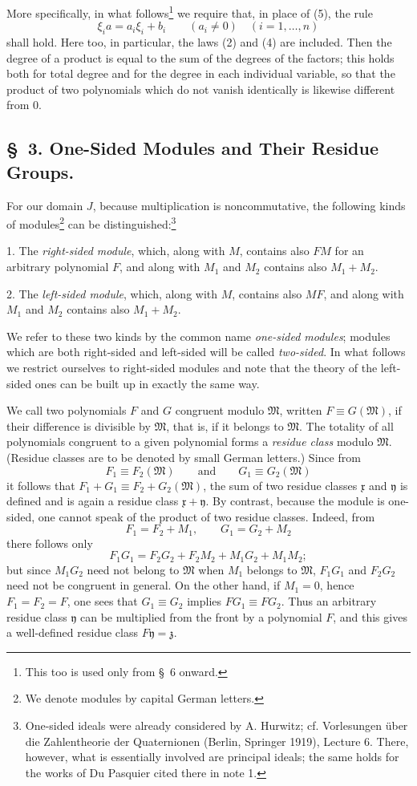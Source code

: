 \documentclass[11pt]{article}
\newcommand{\mM}{\mathfrak{M}}
\newcommand{\mx}{\mathfrak{x}}
\newcommand{\my}{\mathfrak{y}}
\newcommand{\mz}{\mathfrak{z}}
\begin{document}
More specifically, in what follows\footnote{This too is used only from \S~6 onward.} we require that, in place of (5), the rule
\begin{equation}
 \xi_i a=a_i\xi_i+b_i\qquad (a_i\ne0)\quad(i=1,\ldots,n)
\tag{6}
\end{equation}
shall hold. Here too, in particular, the laws (2) and (4) are included. Then the degree of a product is equal to the sum of the degrees of the factors; this holds both for total degree and for the degree in each individual variable, so that the product of two polynomials which do not vanish identically is likewise different from 0.

\subsection*{\S~3. One-Sided Modules and Their Residue Groups.}

For our domain $J$, because multiplication is noncommutative, the following kinds of modules\footnote{We denote modules by capital German letters.} can be distinguished:\footnote{One-sided ideals were already considered by A. Hurwitz; cf. Vorlesungen über die Zahlentheorie der Quaternionen (Berlin, Springer 1919), Lecture 6. There, however, what is essentially involved are principal ideals; the same holds for the works of Du Pasquier cited there in note 1.}

1. The \emph{right-sided module}, which, along with $M$, contains also $FM$ for an arbitrary polynomial $F$, and along with $M_1$ and $M_2$ contains also $M_1+M_2$.

2. The \emph{left-sided module}, which, along with $M$, contains also $MF$, and along with $M_1$ and $M_2$ contains also $M_1+M_2$.

We refer to these two kinds by the common name \emph{one-sided modules}; modules which are both right-sided and left-sided will be called \emph{two-sided}. In what follows we restrict ourselves to right-sided modules and note that the theory of the left-sided ones can be built up in exactly the same way.

We call two polynomials $F$ and $G$ congruent modulo $\mM$, written $F\equiv G(\mM)$, if their difference is divisible by $\mM$, that is, if it belongs to $\mM$. The totality of all polynomials congruent to a given polynomial forms a \emph{residue class} modulo $\mM$. (Residue classes are to be denoted by small German letters.) Since from
\[
 F_1\equiv F_2(\mM)\qquad\text{and}\qquad G_1\equiv G_2(\mM)
\]
it follows that $F_1+G_1\equiv F_2+G_2(\mM)$, the sum of two residue classes $\mx$ and $\my$ is defined and is again a residue class $\mx+\my$. By contrast, because the module is one-sided, one cannot speak of the product of two residue classes. Indeed, from
\[
 F_1=F_2+M_1,\qquad G_1=G_2+M_2
\]
there follows only
\[
 F_1G_1=F_2G_2+F_2M_2+M_1G_2+M_1M_2;
\]
but since $M_1G_2$ need not belong to $\mM$ when $M_1$ belongs to $\mM$, $F_1G_1$ and $F_2G_2$ need not be congruent in general. On the other hand, if $M_1=0$, hence $F_1=F_2=F$, one sees that $G_1\equiv G_2$ implies $FG_1\equiv FG_2$. Thus an arbitrary residue class $\my$ can be multiplied from the front by a polynomial $F$, and this gives a well-defined residue class $F\my=\mz$.
\end{document}
